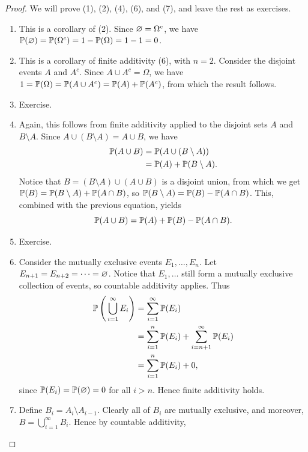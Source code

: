 \begin{proof}
  We will prove (1), (2), (4), (6), and (7), and leave the rest as exercises.
  \begin{enumerate}
    \item This is a corollary of (2). Since $\varnothing = \Omega^{c}$, we have $\operatorname{\mathbb{P}}(\varnothing) = \operatorname{\mathbb{P}}(\Omega^{c}) = 1 - \operatorname{\mathbb{P}}(\Omega) = 1 - 1 = 0$.
    \item This is a corollary of finite additivity (6), with $n = 2$. Consider the disjoint events $A$ and $A^{c}$. Since $A \cup A^{c} = \Omega$, we have $1 = \operatorname{\mathbb{P}}(\Omega) = \operatorname{\mathbb{P}}(A \cup A^{c}) = \operatorname{\mathbb{P}}(A) + \operatorname{\mathbb{P}}(A^{c})$, from which the result follows.
    \item Exercise.
    \item Again, this follows from finite additivity applied to the disjoint sets $A$ and $B \setminus A$. Since $A \cup (B \setminus A) = A \cup B$, we have 
      \begin{align*}
        \operatorname{\mathbb{P}}(A \cup B) &= \operatorname{\mathbb{P}}(A \cup (B \setminus A)) \\
                        &= \operatorname{\mathbb{P}}(A) + \operatorname{\mathbb{P}}(B \setminus A).
      \end{align*}
      Notice that $B = (B \setminus A) \cup (A \cup B)$ is a disjoint union, from which we get $\operatorname{\mathbb{P}}(B) = \operatorname{\mathbb{P}}(B \setminus A) + \operatorname{\mathbb{P}}(A \cap B)$, so $\operatorname{\mathbb{P}}(B \setminus A) = \operatorname{\mathbb{P}}(B) - \operatorname{\mathbb{P}}(A \cap B)$. This, combined with the previous equation, yields \[
        \operatorname{\mathbb{P}}(A \cup B) = \operatorname{\mathbb{P}}(A) + \operatorname{\mathbb{P}}(B) - \operatorname{\mathbb{P}}(A \cap B).
      \] 
    \item Exercise.
    \item Consider the mutually exclusive events $E_1, \dots, E_n$. Let $E_{n+1} = E_{n+2} = \dots = \varnothing$. Notice that $E_1, \dots$ still form a mutually exclusive collection of events, so countable additivity applies. Thus 
      \begin{align*}
        \operatorname{\mathbb{P}} \left( \, \bigcup_{i = 1}^{\infty} E_i \right) &= \sum_{i = 1}^{\infty} \operatorname{\mathbb{P}}(E_i) \\
                                                             &= \sum_{i = 1}^{n} \operatorname{\mathbb{P}}(E_i) + \sum_{i = n+1}^{\infty} \operatorname{\mathbb{P}}(E_i) \\
                                                             &= \sum_{i = 1}^{n} \operatorname{\mathbb{P}}(E_i) + 0,
      \end{align*}
      since $\operatorname{\mathbb{P}}(E_i) = \operatorname{\mathbb{P}}(\varnothing) = 0$ for all $i > n$. Hence finite additivity holds.
    \item Define $B_i = A_i \setminus A_{i - 1}$. Clearly all of $B_i$ are mutually exclusive, and moreover, $B = \bigcup_{i = 1}^{\infty} B_i$. Hence by countable additivity, 

\end{enumerate}
\end{proof}
